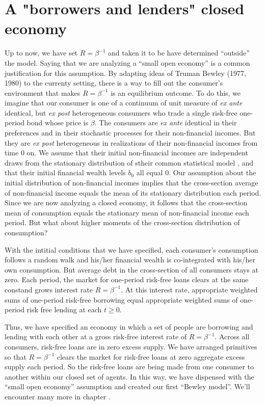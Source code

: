 \section{A "borrowers and lenders" closed economy}\label{sec:borrowlender}%
Up to now, we have set $R = \beta^{-1}$  and  taken it to be have  
determined ``outside'' the model.  Saying that we are analyzing a ``small open economy''  is a common justification  for this assumption.
%
By adapting ideas of   Truman Bewley (1977, 1980) to the currenty setting, there is a way to fill out 
the  consumer's environment  that makes  $R = \beta^{-1}$ is an equilibrium outcome.  
To do this, we imagine that our consumer is one of a  continuum of unit measure of  {\it ex ante} identical, but {\it ex post} heterogeneous consumers who trade a single risk-free one-period bond whose price is $\beta$.  
The consumers are {\it ex ante} identical in their preferences and in their stochastic processes for 
their non-financial incomes.  But they are {\it ex post} heterogeneous in  realizations of their non-financial incomes from time $0$ on.  We assume that their initial
non-financial incomes are independent draws from the stationary distribution  of stheir common statistical model , and that their initial financial wealth levels $b_0$  all equal  $0$. Our assumption about the initial distribution of non-financial incomes implies that the cross-section average of non-financial income equals the mean of its  stationary distribution each period.   
Since we are now analyzing a closed economy, it follows that the cross-section mean of consumption equals the stationary mean of non-financial income each period.  But what about higher moments of the cross-section distribution of consumption? 


With the intitial conditions that we have specified, each consumer's consumption follows a random walk and his/her financial wealth is co-integrated with his/her own consumption. But average debt in the cross-section of all consumers stays at zero.   Each period, the market for one-period risk-free loans clears at the same 
constand grows interest rate $R = \beta^{-1}$. At this interest rate,  appropriate weighted sums of one-period risk-free borrowing equal  appropriate weighted sums of one-period risk free lending at each $t \geq 0$. 


Thus, we have specified  an economy in which a  set of people are borrowing and lending
with each other at a gross risk-free interest rate of
$R = \beta^{-1}$.
Across all consumers, risk-free loans are in zero excess supply.
We have arranged primitives so that $R = \beta^{-1}$ clears the market for risk-free loans at zero aggregate excess supply each period. 
So the risk-free loans are being made from one consumer to another within our closed set of agents.
In this way, we have dispensed with the ``small open economy'' assumption and created our 
first ``Bewley model''.  We'll encounter many more in chapter .

